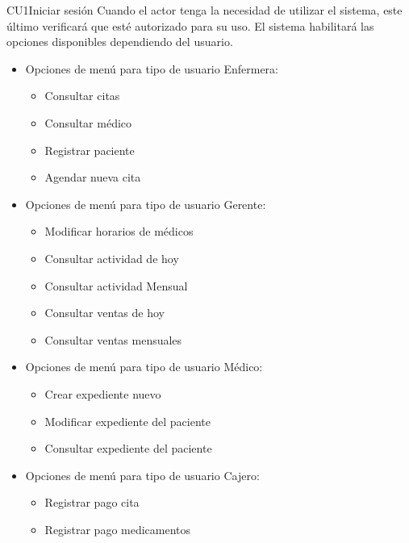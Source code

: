 \begin{UseCase}{CU1}{Iniciar sesión}{
		Cuando el actor tenga la necesidad de utilizar el sistema, este último verificará que esté autorizado para su uso. El sistema habilitará las opciones disponibles dependiendo del usuario.}
{\begin{itemize}
       	\item Opciones de menú para tipo de usuario Enfermera:
			\begin{itemize}
				\item Consultar citas
                \item Consultar médico
				\item Registrar paciente
                \item Agendar nueva cita
			\end{itemize}
        \item Opciones de menú para tipo de usuario Gerente:
			\begin{itemize}
				\item Modificar horarios de médicos
                \item Consultar actividad de hoy
                \item Consultar actividad Mensual
                \item Consultar ventas de hoy
                \item Consultar ventas mensuales
			\end{itemize}
       \item Opciones de menú para tipo de usuario Médico:
			\begin{itemize}
				\item Crear expediente nuevo
                \item Modificar expediente del paciente
				\item Consultar expediente del paciente
			\end{itemize}
       \item Opciones de menú para tipo de usuario Cajero:
			\begin{itemize}
                \item Registrar pago cita
				\item Registrar pago medicamentos
			\end{itemize}   
	\end{itemize}
    }
\end{UseCase}

